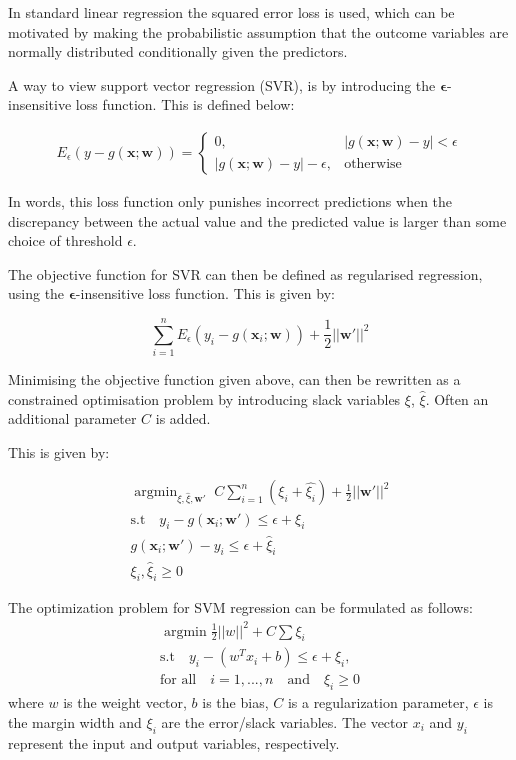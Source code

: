 \documentclass[11pt]{article}
\theoremstyle{definition}
\DeclareMathOperator*{\argmin}{argmin}
\newcommand{\bx}{\mathbf{x}}
\newcommand{\bw}{\mathbf{w}}
\begin{document}
In standard linear regression the squared error loss is used, which can be motivated by making the probabilistic assumption that the outcome variables are normally distributed conditionally given the predictors.

A way to view support vector regression (SVR), is by introducing the $\boldsymbol{\epsilon}$-insensitive loss function.  
This is defined below:

\begin{align} \label{eq:binary linear classifier}
    E_{\epsilon}(y - g(\bx;\bw)) =
     \begin{cases}
       0, \quad &|g(\bx;\bw) - y| < \epsilon
       \\
       |g(\bx;\bw) - y| - \epsilon, &\text{otherwise}
     \end{cases}
\end{align}

In words, this loss function only punishes incorrect predictions when the discrepancy between the actual value and the predicted value is larger than some choice of threshold $\epsilon$.

The objective function for SVR can then be defined as regularised regression, using the $\boldsymbol{\epsilon}$-insensitive loss function.  
This is given by:

\begin{equation}
\sum_{i = 1}^{n}{E_{\epsilon}(y_i - g(\bx_i;\bw))} + \frac{1}{2}||\bw'||^2    
\end{equation}



Minimising the objective function given above, can then be rewritten as a constrained optimisation problem by introducing slack variables $\xi$, $\hat{\xi}$. Often an additional parameter $C$ is added.

This is given by:


\begin{align}
\argmin_{\xi,\hat{\xi},\bw'} \; C{\sum_{i = 1}^{n}}{(\xi_i + \hat{\xi_i})} + \frac{1}{2}||\bw'||^2 \nonumber\\
\text{s.t} \quad y_i - g(\bx_i;\bw') \leq \epsilon + \xi_i \label{eq:SVR formulation}\\
g(\bx_i;\bw') - y_i \leq \epsilon + \hat{\xi}_i \nonumber\\
\xi_i, \hat{\xi}_i \geq 0 \nonumber
\end{align}

The optimization problem for SVM regression can be formulated as follows:
\begin{align}
\argmin \frac{1}{2}||w||^2 + C \sum \xi_i \\
\text{s.t} \quad y_i - (w^T x_i + b) \leq \epsilon + \xi_i , \\
\text{for all} \quad i = 1, ..., n \quad \text{and} \quad \xi_i \geq 0
\end{align}
where $w$ is the weight vector, $b$ is the bias, $C$ is a regularization parameter, $\epsilon$ is the margin width and $\xi_i$ are the error/slack variables. The vector $x_i$ and $y_i$ represent the input and output variables, respectively.
\end{document}
